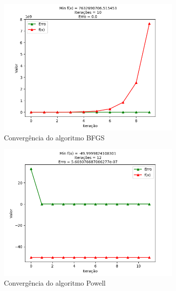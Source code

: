 \documentclass[a4paper, 12pt]{article}
\begin{document}
\begin{figure}[H]
\centering
\begin{subfigure}{0.3\textwidth}
  \centering
  \includegraphics[width=\linewidth]{5/MPFE/B/BFGS/convergencia.png}
  \caption{Convergência do algoritmo BFGS}
\end{subfigure}%
\begin{subfigure}{0.3\textwidth}
  \centering
  \includegraphics[width=\linewidth]{5/MPFE/A/Powell/convergencia.png}
  \caption{Convergência do algoritmo Powell}
\end{subfigure}
\begin{subfigure}{0.3\textwidth}
  \centering

\end{subfigure}
\end{figure}
\end{document}
